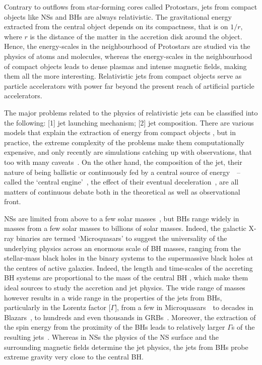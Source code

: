 Contrary to outflows from star-forming cores called Protostars, jets from compact objects like NSs and BHs are always relativistic. The gravitational energy extracted from the central object depends on its compactness, that is on $1/r$, where $r$ is the distance of the matter in the accretion disk around the object. Hence, the energy-scales in the neighbourhood of Protostars are studied via the physics of atoms and molecules, whereas the energy-scales in the neighbourhood of compact objects leads to dense plasmas and intense magnetic fields, making them all the more interesting. Relativistic jets from compact objects serve as particle accelerators with power far beyond the present reach of artificial particle accelerators.

The major problems related to the physics of relativistic jets can be classified into the following: [1] jet launching mechanism; [2] jet composition. There are various models that explain the extraction of energy from compact objects \citep{Blandford_&_Znajek-1977-MNRAS,Blandford_&_Konigl-1979-ApJ,Blandford_&_Payne-1982-MNRAS}, but in practice, the extreme complexity of the problems make them computationally expensive, and only recently are simulations catching up with observations, that too with many caveats \,\Rlots. On the other hand, the composition of the jet, their nature of being ballistic or continuously fed by a central source of energy \,\R\, -- called the `central engine' \,\Rlots, the effect of their eventual deceleration \,\R, are all matters of continuous debate both in the theoretical as well as observational front.

NSs are limited from above to a few solar masses \,\R, but BHs range widely in masses from a few solar masses to billions of solar masses. Indeed, the galactic X-ray binaries are termed `Microquasars' \citep{Mirabel_&_Rodriguez-1998-Nature} to suggest the universality of the underlying physics across an enormous scale of BH masses, ranging from the stellar-mass black holes in the binary systems to the supermassive black holes at the centres of active galaxies. Indeed, the length and time-scales of the accreting BH systems are proportional to the mass of the central BH \citep{Sams_et_al.-1996-Nature}, which make them ideal sources to study the accretion and jet physics. The wide range of masses however results in a wide range in the properties of the jets from BHs, particularly in the Lorentz factor [$\Gamma$], from a few in Microquasars \,\R\, to decades in Blazars \,\R, to hundreds and even thousands in GRBs \,\R. Moreover, the extraction of the spin energy from the proximity of the BHs leads to relatively larger $\Gamma$s of the resulting jets \,\R. Whereas in NSs the physics of the NS surface and the surrounding magnetic fields determine the jet physics, the jets from BHs probe extreme gravity very close to the central BH.

